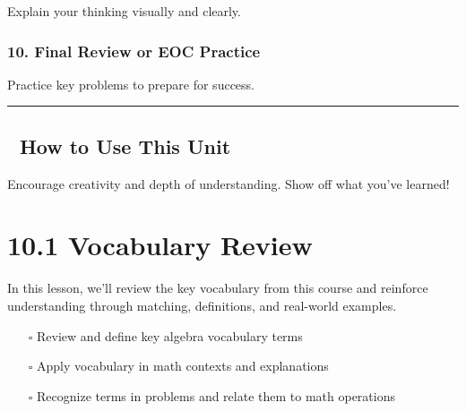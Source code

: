 \documentclass[
  letterpaper,
]{scrrept}
\providecommand{\tightlist}{%
  \setlength{\itemsep}{0pt}\setlength{\parskip}{0pt}}
\begin{document}
Explain your thinking visually and clearly.

\subsection*{10. Final Review or EOC
Practice}\label{final-review-or-eoc-practice}

Practice key problems to prepare for success.

\begin{center}\rule{0.5\linewidth}{0.5pt}\end{center}

\section*{🧭 How to Use This Unit}\label{how-to-use-this-unit-7}


Encourage creativity and depth of understanding. Show off what you've
learned!

\chapter*{10.1 Vocabulary Review}\label{vocabulary-review-1}


In this lesson, we'll review the key vocabulary from this course and
reinforce understanding through matching, definitions, and real-world
examples.

\begin{tcolorbox}[enhanced jigsaw, colframe=quarto-callout-note-color-frame, opacitybacktitle=0.6, arc=.35mm, coltitle=black, leftrule=.75mm, toprule=.15mm, opacityback=0, bottomrule=.15mm, breakable, title={🎯 Objectives}, colback=white, bottomtitle=1mm, toptitle=1mm, titlerule=0mm, rightrule=.15mm, left=2mm, colbacktitle=quarto-callout-note-color!10!white]

\begin{itemize}
\tightlist
\item[$\square$]
  Review and define key algebra vocabulary terms
\item[$\square$]
  Apply vocabulary in math contexts and explanations
\item[$\square$]
  Recognize terms in problems and relate them to math operations
\end{itemize}

\end{tcolorbox}
\end{document}
